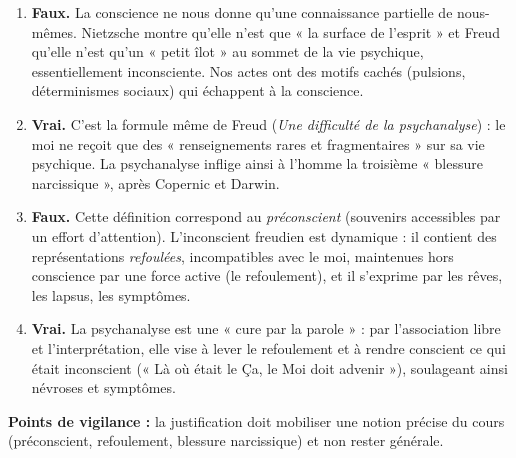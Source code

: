 \documentclass[11pt]{article}
\begin{document}
\begin{corrige}
\begin{enumerate}
\item \textbf{Faux.} La conscience ne nous donne qu'une connaissance partielle de nous-mêmes. Nietzsche montre qu'elle n'est que « la surface de l'esprit » et Freud qu'elle n'est qu'un « petit îlot » au sommet de la vie psychique, essentiellement inconsciente. Nos actes ont des motifs cachés (pulsions, déterminismes sociaux) qui échappent à la conscience.
\item \textbf{Vrai.} C'est la formule même de Freud (\emph{Une difficulté de la psychanalyse}) : le moi ne reçoit que des « renseignements rares et fragmentaires » sur sa vie psychique. La psychanalyse inflige ainsi à l'homme la troisième « blessure narcissique », après Copernic et Darwin.
\item \textbf{Faux.} Cette définition correspond au \emph{préconscient} (souvenirs accessibles par un effort d'attention). L'inconscient freudien est dynamique : il contient des représentations \emph{refoulées}, incompatibles avec le moi, maintenues hors conscience par une force active (le refoulement), et il s'exprime par les rêves, les lapsus, les symptômes.
\item \textbf{Vrai.} La psychanalyse est une « cure par la parole » : par l'association libre et l'interprétation, elle vise à lever le refoulement et à rendre conscient ce qui était inconscient (« Là où était le Ça, le Moi doit advenir »), soulageant ainsi névroses et symptômes.
\end{enumerate}
\textbf{Points de vigilance :} la justification doit mobiliser une notion précise du cours (préconscient, refoulement, blessure narcissique) et non rester générale.
\end{corrige}
\end{document}
